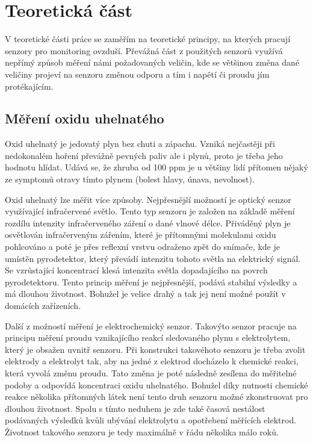 \chapter{Teoretická část}

V teoretické části práce se zaměřím na teoretické principy, na kterých pracují senzory pro monitoring ovzduší. Převážná část z použitých senzorů využívá nepřímý způsob měření námi požadovaných veličin, kde se většinou změna dané veličiny projeví na senzoru změnou odporu a tím i napětí či proudu jím protékajícím.

\section{Měření oxidu uhelnatého}

Oxid uhelnatý je jedovatý plyn bez chuti a zápachu. Vzniká nejčastěji při nedokonalém hoření převážně pevných paliv ale i plynů, proto je třeba jeho hodnotu hlídat. Udává se, že zhruba od 100 ppm je u většiny lidí přítomen nějaký ze symptomů otravy tímto plynem (bolest hlavy, únava, nevolnost).

Oxid uhelnatý lze měřit více způsoby. Nejpřesnější možností je optický senzor využívající infračervené světlo. Tento typ senzoru je založen na základě měření rozdílu intenzity infračerveného záření o dané vlnové délce. Přiváděný plyn je osvětlován infračerveným zářením, které je přítomnými molekulami oxidu pohlcováno a poté je přes reflexní vrstvu odraženo zpět do snímače, kde je umístěn pyrodetektor, který převádí intenzitu tohoto světla na elektrický signál. Se vzrůstající koncentrací klesá intenzita světla dopadajícího na povrch pyrodetektoru. Tento princip měření je nejpřesnější, podává stabilní výsledky a má dlouhou životnost. Bohužel je velice drahý a tak jej není možné použít v domácích zařízeních.

Další z možností měření je elektrochemický senzor. Takovýto senzor pracuje na principu měření proudu vznikajícího reakcí sledovaného plynu s elektrolytem, který je obsažen uvnitř senzoru. Při konstrukci takovéhoto senzoru je třeba zvolit elektrody a elektrolyt tak, aby na jedné z elektrod docházelo k chemické reakci, která vyvolá změnu proudu. Tato změna je poté následně zesílena do měřitelné podoby a odpovídá koncentraci oxidu uhelnatého. Bohužel díky nutnosti chemické reakce několika přítomných látek není tento druh senzoru možné zkonstruovat pro dlouhou životnost. Spolu s tímto neduhem je zde také časová nestálost podávaných výsledků kvůli ubývání elektrolytu a opotřebení měřících elektrod. Životnost takového senzoru je tedy maximálně v řádu několika málo roků. 

